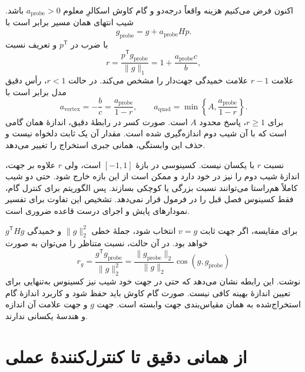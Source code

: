 اکنون فرض می‌کنیم هزینه واقعاً درجه‌دو و گام کاوش اسکالرِ معلوم $a_{\mathrm{probe}}>0$ باشد. شیب انتهای همان مسیر برابر است با
\begin{equation}
g_{\mathrm{probe}}=g+a_{\mathrm{probe}}Hp.
\label{eq:method-probe-gradient}
\end{equation}
با ضرب در $p^{\mathsf T}$ و تعریف نسبت
\begin{equation}
r=\frac{p^{\mathsf T}g_{\mathrm{probe}}}{\|g\|_1}
=1+\frac{a_{\mathrm{probe}}c}{b},
\label{eq:method-ratio}
\end{equation}
علامت $r-1$ علامت خمیدگی جهت‌دار را مشخص می‌کند. در حالت $r<1$، رأس دقیق مدل برابر است با
\begin{equation}
a_{\mathrm{vertex}}=-\frac{b}{c}
=\frac{a_{\mathrm{probe}}}{1-r},\qquad
a_{\mathrm{quad}}=\min\left\{A,\frac{a_{\mathrm{probe}}}{1-r}\right\}.
\label{eq:method-exact-probe}
\end{equation}
برای $r\geq1$، پاسخ محدود $A$ است. صورت کسر در رابطهٔ دقیق، اندازهٔ همان گامی است که با آن شیب دوم اندازه‌گیری شده است. مقدار آن یک ثابت دلخواه نیست و حذف این وابستگی، همانی جبری استخراج را تغییر می‌دهد.

نسبت $r$ با \pertalign{} یکسان نیست. \pertalign{} کسینوسی در بازهٔ $[-1,1]$ است، ولی $r$ علاوه بر جهت، اندازهٔ شیب دوم را نیز در خود دارد و ممکن است از این بازه خارج شود. حتی دو شیب کاملاً هم‌راستا می‌توانند نسبت بزرگی یا کوچکی بسازند. پس الگوریتم برای کنترل گام، فقط کسینوس فصل قبل را در فرمول قرار نمی‌دهد. تشخیص این تفاوت برای تفسیر نمودارهای پایش و اجرای درست قاعده ضروری است.

برای مقایسه، اگر جهت ثابت $v=g$ انتخاب شود، جملهٔ خطی $\|g\|_2^2$ و خمیدگی $g^{\mathsf T}Hg$ خواهد بود. در آن حالت، نسبت متناظر را می‌توان به صورت
\begin{equation}
r_g=\frac{g^{\mathsf T}g_{\mathrm{probe}}}{\|g\|_2^2}
=\frac{\|g_{\mathrm{probe}}\|_2}{\|g\|_2}
\cos(g,g_{\mathrm{probe}})
\label{eq:method-gradient-ratio}
\end{equation}
نوشت. این رابطه نشان می‌دهد که حتی در جهت خود شیب نیز کسینوس به‌تنهایی برای تعیین اندازهٔ بهینه کافی نیست. صورت گام کاوش باید حفظ شود و کاربرد اندازهٔ گام استخراج‌شده به همان مقیاس‌بندی جهت وابسته است. جهت $g$ و جهت علامت آن اندازه و هندسهٔ یکسانی ندارند.

\section{از همانی دقیق تا کنترل‌کنندهٔ عملی}
\label{sec:method-practical}

